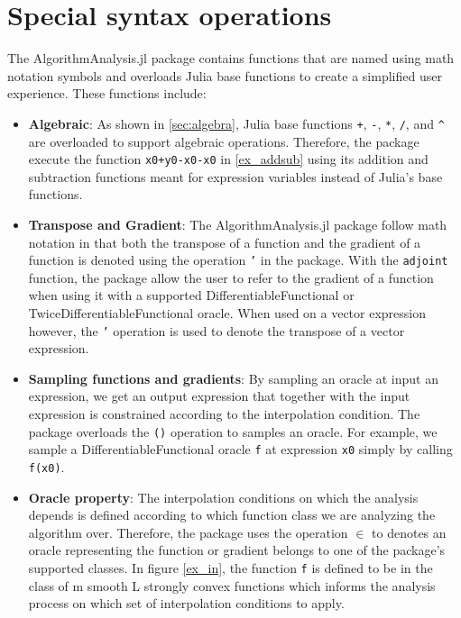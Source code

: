 \section{Special syntax operations}

The AlgorithmAnalysis.jl package contains functions that are named using math notation symbols and overloads Julia base functions to create a simplified user experience. These functions include:
\begin{itemize}
    \item \textbf{Algebraic}: As shown in \ref{sec:algebra}, Julia base functions \texttt{+}, \texttt{-}, \texttt{*}, \texttt{/}, and \texttt{\textasciicircum} are overloaded to support algebraic operations. Therefore, the package execute the function \texttt{x0+y0-x0-x0} in \ref*{ex_addsub} using its addition and subtraction functions meant for expression variables instead of Julia's base functions.
    
	\item \textbf{Transpose and Gradient}: The AlgorithmAnalysis.jl package follow math notation in that both the transpose of a function and the gradient of a function is denoted using the operation \texttt{'} in the package. With the \texttt{adjoint} function, the package allow the user to refer to the gradient of a function when using it with a supported DifferentiableFunctional or TwiceDifferentiableFunctional oracle. When used on a vector expression however, the \texttt{'} operation is used to denote the transpose of a vector expression.

    \item \textbf{Sampling functions and gradients}: By sampling an oracle at input an expression, we get an output expression that together with the input expression is constrained according to the interpolation condition. The package overloads the \texttt{()} operation to samples an oracle. For example, we sample a DifferentiableFunctional oracle \texttt{f} at expression \texttt{x0} simply by calling \texttt{f(x0)}.

    \item \textbf{Oracle property}: The interpolation conditions on which the analysis depends is defined according to which function class we are analyzing the algorithm over. Therefore, the package uses the operation \texttt{$\in$} to denotes an oracle representing the function or gradient belongs to one of the package's supported classes. In figure \ref*{ex_in}, the function \texttt{f} is defined to be in the class of m smooth L strongly convex functions which informs the analysis process on which set of interpolation conditions to apply.
\end{itemize}

